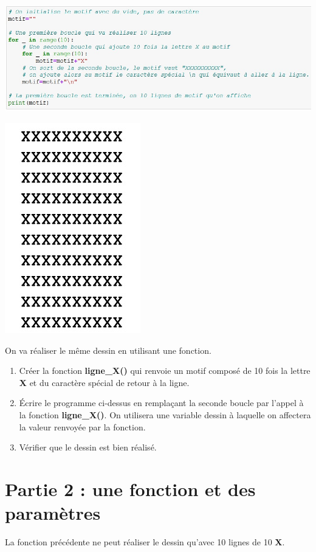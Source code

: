 \documentclass[11pt,a4paper]{article}
\begin{document}
\begin{minipage}{14cm}
\includegraphics[scale=0.6]{img/bouclemotifX.jpg}
\end{minipage}\hfill
\begin{minipage}{2.6cm}
\includegraphics[scale=0.7]{img/carreX.jpg}
\end{minipage}\medskip

On va réaliser le même dessin en utilisant une fonction.

\begin{enumerate}
\item Créer la fonction \textbf{ligne\_X()} qui renvoie un motif composé de 10 fois la lettre \textbf{X} et du caractère spécial de retour à la ligne.
\item Écrire le programme ci-dessus en remplaçant la seconde boucle par l'appel à la fonction \textbf{ligne\_X()}. On utilisera une variable dessin à laquelle on affectera la valeur renvoyée par la fonction.
\item Vérifier que le dessin est bien réalisé.
\end{enumerate}

\section*{Partie 2 : une fonction et des paramètres}
La fonction précédente ne peut réaliser le dessin qu'avec 10 lignes de 10 \textbf{X}.\medskip
\end{document}
